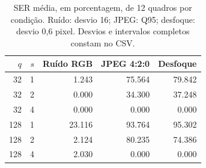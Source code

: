 \begin{table}[htbp]
\centering\small
\begin{tabular}{rrrrr}
\toprule
$q$ & $s$ & Ruído RGB & JPEG 4:2:0 & Desfoque\\
\midrule
32 & 1 & 1.243 & 75.564 & 79.842\\
32 & 2 & 0.000 & 34.300 & 37.248\\
32 & 4 & 0.000 & 0.000 & 0.000\\
128 & 1 & 23.116 & 93.764 & 95.302\\
128 & 2 & 2.124 & 80.235 & 74.386\\
128 & 4 & 2.030 & 0.000 & 0.000\\
\bottomrule
\end{tabular}
\caption{SER média, em porcentagem, de 12 quadros por condição. Ruído: desvio 16; JPEG: Q95; desfoque: desvio 0,6 pixel. Desvios e intervalos completos constam no CSV.}
\end{table}
